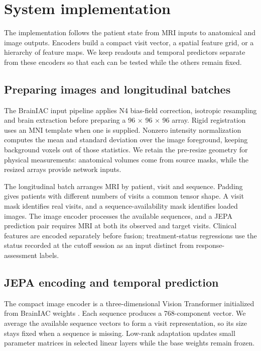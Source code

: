 \clearpage
\chapter{System implementation}\label{ch:implementation}
\begingroup
{}

The implementation follows the patient state from MRI inputs to anatomical and image outputs. Encoders build a compact visit vector, a spatial feature grid, or a hierarchy of feature maps. We keep readouts and temporal predictors separate from these encoders so that each can be tested while the others remain fixed.

\section{Preparing images and longitudinal batches}

The BrainIAC input pipeline applies N4 bias-field correction, isotropic resampling and brain extraction before preparing a 96 × 96 × 96 array. Rigid registration uses an MNI template when one is supplied. Nonzero intensity normalization computes the mean and standard deviation over the image foreground, keeping background voxels out of those statistics. We retain the pre-resize geometry for physical measurements: anatomical volumes come from source masks, while the resized arrays provide network inputs.

The longitudinal batch arranges MRI by patient, visit and sequence. Padding gives patients with different numbers of visits a common tensor shape. A visit mask identifies real visits, and a sequence-availability mask identifies loaded images. The image encoder processes the available sequences, and a JEPA prediction pair requires MRI at both its observed and target visits. Clinical features are encoded separately before fusion; treatment-status regressions use the status recorded at the cutoff session as an input distinct from response-assessment labels.

\section{JEPA encoding and temporal prediction}

The compact image encoder is a three-dimensional Vision Transformer initialized from BrainIAC weights \cite{ref16}. Each sequence produces a 768-component vector. We average the available sequence vectors to form a visit representation, so its size stays fixed when a sequence is missing. Low-rank adaptation updates small parameter matrices in selected linear layers while the base weights remain frozen.

